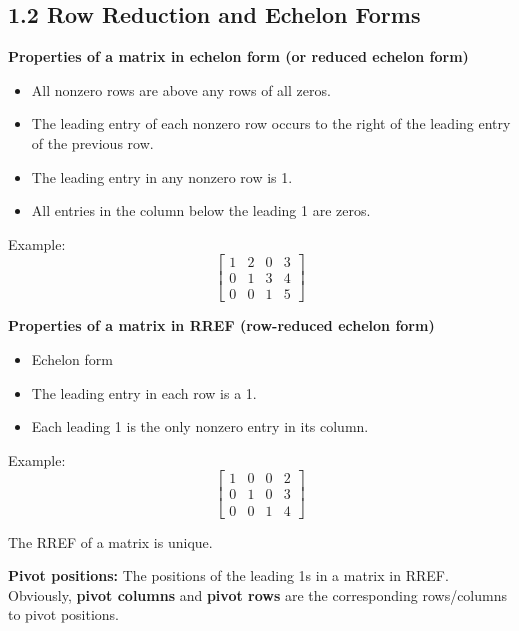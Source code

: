 \documentclass[12pt]{article}
\newcommand{\definition}[2]{
  \noindent\textbf{#1:} #2
}
\begin{document}
\subsection*{1.2 Row Reduction and Echelon Forms}

\begin{definitionbox}
    \textbf{Properties of a matrix in echelon form (or reduced echelon form)}
    \begin{itemize}
        \item All nonzero rows are above any rows of all zeros.
        \item The leading entry of each nonzero row occurs to the right of the leading entry of the previous row.
        \item The leading entry in any nonzero row is 1.
        \item All entries in the column below the leading 1 are zeros.
    \end{itemize}
    Example:
    \[
    \begin{bmatrix}
        1 & 2 & 0 & 3 \\
        0 & 1 & 3 & 4 \\
        0 & 0 & 1 & 5
    \end{bmatrix}
    \]
\end{definitionbox}



\begin{definitionbox}
    \textbf{Properties of a matrix in RREF (row-reduced echelon form)}
    \begin{itemize}
        \item Echelon form
        \item The leading entry in each row is a 1.
        \item Each leading 1 is the only nonzero entry in its column.
    \end{itemize}
    Example:
    \[
    \begin{bmatrix}
        1 & 0 & 0 & 2 \\
        0 & 1 & 0 & 3 \\
        0 & 0 & 1 & 4
    \end{bmatrix}
    \]
    \begin{note}
        The RREF of a matrix is unique.
    \end{note}
\end{definitionbox}

\vspace{20px}
\definition{Pivot positions}{The positions of the leading 1s in a matrix in RREF. Obviously, \textbf{pivot columns} and \textbf{pivot rows} are the corresponding rows/columns to pivot positions.}
\end{document}
